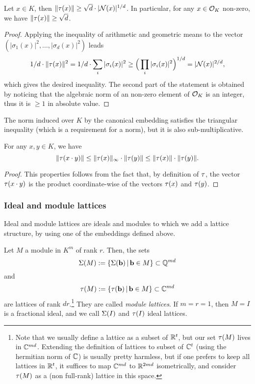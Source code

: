 \begin{lemma}
\label{lemma:AM-GM-inequality}
Let $x \in K$, then $\|\tau(x)\| \geq \sqrt{d} \cdot |\mathcal{N}(x)|^{1/d}$. In particular, for any $x \in \mathcal{O}_K$ non-zero, we have $\|\tau(x)\| \geq \sqrt{d}$.
\end{lemma}

\begin{proof}
Applying the inequality of arithmetic and geometric means to the vector $(|\sigma_1(x)|^2, \dots, |\sigma_d(x)|^2)$ leads
\[ 1/d \cdot \|\tau(x)\|^2 = 1/d \cdot \sum_i |\sigma_i(x)|^2 \geq \Big(\prod_i |\sigma_i(x)|^2\Big)^{1/d} = |\mathcal{N}(x)|^{2/d},\]
which gives the desired inequality. The second part of the statement is obtained by noticing that the algebraic norm of an non-zero element of $\mathcal{O}_K$ is an integer, thus it is $\geq 1$ in absolute value.
\end{proof}

The norm induced over $K$ by the canonical embedding satisfies the triangular inequality (which is a requirement for a norm), but it is also sub-multiplicative.

\begin{lemma}
For any $x,y \in K$, we have
\[\|\tau(x \cdot y)\| \leq \|\tau(x)\|_\infty \cdot \|\tau(y)\| \leq \|\tau(x)\| \cdot \|\tau(y)\|.\]
\end{lemma}

\begin{proof}
This properties follows from the fact that, by definition of $\tau$, the vector $\tau(x \cdot y)$ is the product coordinate-wise of the vectors $\tau(x)$ and $\tau(y)$.
\end{proof}

\subsubsection{Ideal and module lattices}
\label{sec:id-mod-lat}
Ideal and module lattices are ideals and modules to which we add a lattice structure, by using one of the embeddings defined above.

\begin{proposition}
Let $M$ a module in $K^m$ of rank $r$. Then, the sets 
\[\Sigma(M) := \{ \Sigma(\mathbf b)\,|\, \mathbf b\in M\} \subset \mathbb{Q}^{md}\]
and 
\[\tau(M) := \{ \tau(\mathbf b)\,|\, \mathbf b\in M\} \subset \mathbb{C}^{md}\]
are lattices of rank $dr$.\footnote{Note that we usually define a lattice as a subset of $\mathbb{R}^t$, but our set $\tau(M)$ lives in $\mathbb{C}^{md}$. Extending the definition of lattices to subset of $\mathbb{C}^t$ (using the hermitian norm of $\mathbb{C}$) is usually pretty harmless, but if one prefers to keep all lattices in $\mathbb{R}^t$, it suffices to map $\mathbb{C}^{md}$ to $\mathbb{R}^{2md}$ isometrically, and consider $\tau(M)$ as a (non full-rank) lattice in this space.}
They are called \textit{module lattices}. If $m = r = 1$, then $M = I$ is a fractional ideal, and we call $\Sigma(I)$ and $\tau(I)$ ideal lattices.
\end{proposition}

